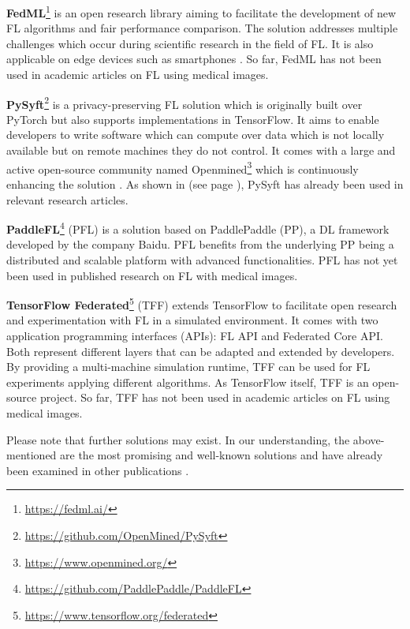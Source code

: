 \textbf{FedML}\footnote{\url{https://fedml.ai/}}
is an open research library aiming to facilitate the development of new FL algorithms and fair performance comparison. The solution addresses multiple challenges which occur during scientific research in the field of FL. It is also applicable on edge devices such as smartphones \citep{He2020FedML:Learning}.
So far, FedML has not been used in academic articles on FL using medical images.

\textbf{PySyft}\footnote{\url{https://github.com/OpenMined/PySyft}}
is a privacy-preserving FL solution which is originally built over PyTorch but also supports implementations in TensorFlow. It aims to enable developers to write software which can compute over data which is not locally available but on remote machines they do not control. It comes with a large and active open-source community named Openmined\footnote{\url{https://www.openmined.org/}} which is continuously enhancing the solution \citep{Ryffel2018ALearning}. As shown in  (see page \pageref{subsec:LitRev}), PySyft has already been used in relevant research articles.

\textbf{PaddleFL}\footnote{\url{https://github.com/PaddlePaddle/PaddleFL}}
(PFL) is a solution based on PaddlePaddle (PP), a DL framework developed by the company Baidu. PFL benefits from the underlying PP being a distributed and scalable platform with advanced functionalities.
PFL has not yet been used in published research on FL with medical images.

\textbf{TensorFlow Federated}\footnote{\url{https://www.tensorflow.org/federated}}
(TFF) extends TensorFlow to facilitate open research and experimentation with FL in a simulated environment. It comes with two application programming interfaces (APIs): FL API and Federated Core API. Both represent different layers that can be adapted and extended by developers. By providing a multi-machine simulation runtime, TFF can be used for FL experiments applying different algorithms. As TensorFlow itself, TFF is an open-source project. So far, TFF has not been used in academic articles on FL using medical images.

Please note that further solutions may exist. In our understanding, the above-mentioned are the most promising and well-known solutions and have already been examined in other publications \citep{Li2019AProtection, He2020FedML:Learning}.




